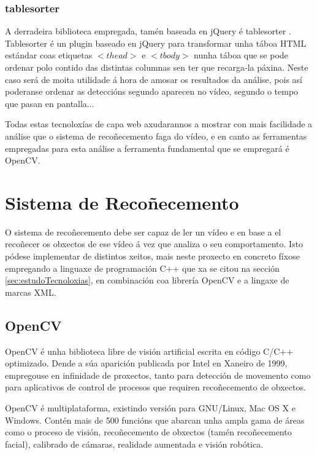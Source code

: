         \subsubsection{tablesorter}
        
            A derradeira biblioteca empregada, tamén baseada en jQuery é tablesorter
            \cite{tablesorter-webPage}. Tablesorter é un plugin baseado en jQuery para transformar 
            unha táboa HTML estándar coas etiquetas $<thead>$ e $<tbody>$ nunha táboa que se pode 
            ordenar polo contido das distintas columnas sen ter que recarga-la páxina. Neste
            caso será de moita utilidade á hora de amosar os resultados da análise, pois así 
            poderanse ordenar as deteccións segundo aparecen no vídeo, segundo o tempo que pasan 
            en pantalla... 
        
    Todas estas tecnoloxías de capa web axudarannos a mostrar con mais facilidade a análise que o
    sistema de recoñecemento faga do vídeo, e en canto as ferramentas empregadas para esta análise
    a ferramenta fundamental que se empregará é OpenCV.
    
\section{Sistema de Recoñecemento}
    O sistema de recoñecemento debe ser capaz de ler un vídeo e en base a el recoñecer os obxectos
    de ese vídeo á vez que analiza o seu comportamento. Isto pódese implementar de distintos xeitos,
    mais neste proxecto en concreto fíxose empregando a linguaxe de programación C++ que xa se citou
    na sección \ref{sec:estudoTecnoloxias}, en combinación coa librería OpenCV e a lingaxe de marcas
    XML.

\subsection{OpenCV}
    
    OpenCV é unha biblioteca libre de visión artificial escrita en código C/C++ optimizado.
    Dende a súa aparición publicada por Intel en Xaneiro de 1999, empregouse en infinidade 
    de proxectos, tanto para detección de movemento como para aplicativos de control de procesos
    que requiren recoñecemento de obxectos.
    
    OpenCV é multiplataforma, existindo versión para GNU/Linux, Mac OS X e Windows. Contén mais 
    de 500 funcións que abarcan unha ampla gama de áreas como o proceso de visión, recoñecemento
    de obxectos (tamén recoñecemento facial), calibrado de cámaras, realidade aumentada e visión
    robótica.
    
